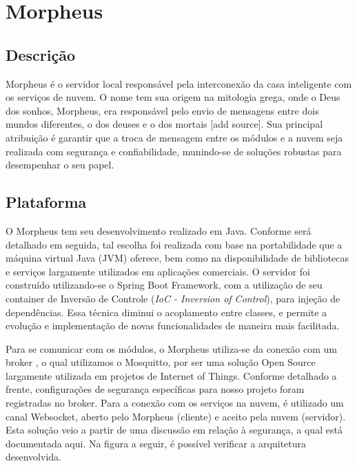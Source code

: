 \section{Morpheus}

\subsection{Descrição}
Morpheus é o servidor local responsável pela interconexão da casa inteligente com os serviços de nuvem. O nome tem sua origem na mitologia grega, onde o Deus dos sonhos, Morpheus, era responsável pelo envio de mensagens entre dois mundos diferentes, o dos deuses e o dos mortais [add source]. Sua principal atribuição é garantir que a troca de mensagem entre os módulos e a nuvem seja realizada com segurança e confiabilidade, munindo-se de soluções robustas para desempenhar o seu papel.

\subsection{Plataforma}
O Morpheus tem seu desenvolvimento realizado em Java. Conforme será detalhado em seguida, tal escolha foi realizada com base na portabilidade que a máquina virtual Java (JVM) oferece, bem como na disponibilidade de bibliotecas e serviços largamente utilizados em aplicações comerciais. O servidor foi construído utilizando-se o Spring Boot Framework, com a utilização de seu container de Inversão de Controle (\textit{IoC - Inversion of Control}), para injeção de dependências. Essa técnica diminui o acoplamento entre classes, e permite a evolução e implementação de novas funcionalidades de maneira mais facilitada.

Para se comunicar com os módulos, o Morpheus utiliza-se da conexão com um broker \wmqtt{}, o qual utilizamos o Mosquitto, por ser uma solução Open Source largamente utilizada em projetos de Internet of Things. Conforme detalhado a frente, configurações de segurança específicas para nosso projeto foram registradas no broker. Para a conexão com os serviços na nuvem, é utilizado um canal Websocket, aberto pelo Morpheus (cliente) e aceito pela nuvem (servidor). Esta solução veio a partir de uma discussão em relação à segurança, a qual está documentada aqui. Na figura a seguir, é possível verificar a arquitetura desenvolvida.

